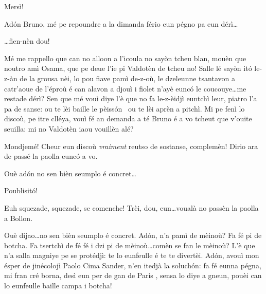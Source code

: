 \begin{drama}
\Presidanspeaks Mersì!


\Presidanspeaks Ad\'on Bruno, mé pe repoundre a la dimanda fério eun pégno pa eun dérì\ldots

\Brunospeaks \ldots fien-nèn dou!


\Presidanspeaks Mé me rappello que can no alloon a l’icoula no sayòn tcheu blan, mouèn que noutro amì Osama, que pe deue l'ie pi Valdotèn de tcheu no! Salle lé sayòn it\'o le-z-àn de la grousa nèi, lo pou fiave pamì de-z-où\ou , le dzeleunne tsantavon a catr'aoue de l'éproù é can alavon a djouì i fiolet n'ayè eunc\'o le coucouye\ldots me restade dérì? Sen que mé vouì diye l'è que no fa le-z-èidjì euntchì leur, piatro l'a pa de sanse: ou te lèi baille le pèiss\'on \pesce\ ou te lèi aprèn a pitchì. Mi pe fenì lo discoù, pe itre clléya, vouì fé an demanda a té Bruno é a vo tcheut que v'ouite seuilla: mi no Valdotèn iaou vouillèn alé?


\Brunospeaks {} Mondjemé! Cheur eun discoù \textit{vraiment} reutso de sostanse,  complemèn!  Dirio ara de passé la paolla eunc\'o a vo.

\Jordyspeaks Ouè ad\'on no sen bièn seumplo é concret\ldots

\Brunospeaks Poublisit\'o!



\Brunospeaks {} Euh squezade, squezade, se comenche! Trèi, dou, eun\ldots voualà no passèn la paolla a Bollon.

\Jordyspeaks Ouè dijao\ldots no sen bièn seumplo é concret. Ad\'on, n'a pamì de mèinoù? Fa fé pi de botcha. Fa tsertchì de fé fé i dzi pi de mèinoù\ldots comèn se fan le mèinoù? L'è que n'a salla magniye pe se protédjì: te lo eunfeulle  é te te divertèi. Ad\'on, avouì mon ésper de jinécolojì Paolo Cima Sander, n'en itedjà la soluch\'on: fa fé eunna pégna, mi fran cré borna, desì eun per de gan de Paris \condom, sensa lo diye a gneun, pouèi can lo eunfeulle baille campa i botcha!


\end{drama}
